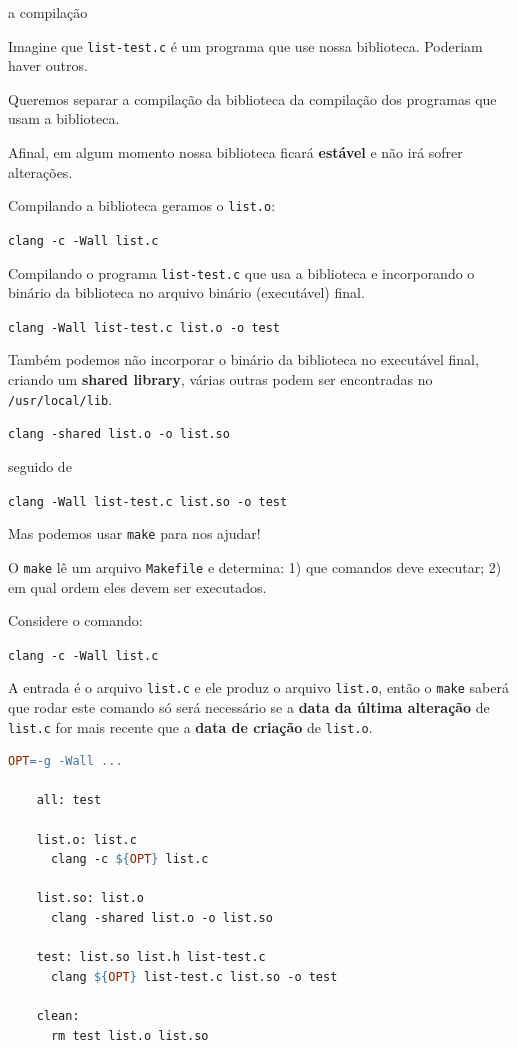 \documentclass{beamer}
\begin{document}
\begin{frame}{a compilação}

  Imagine que \texttt{list-test.c} é um programa que use nossa
  biblioteca. Poderiam haver outros.

  Queremos separar a compilação da biblioteca da compilação dos programas que usam a biblioteca.

  Afinal, em algum momento nossa biblioteca ficará \textbf{estável} e
  não irá sofrer alterações.

  \framebreak

  Compilando a biblioteca geramos o \texttt{list.o}:

  \texttt{clang -c -Wall list.c}

  Compilando o programa \texttt{list-test.c} que usa a biblioteca e
  incorporando o binário da biblioteca no arquivo binário (executável)
  final.
  
  \texttt{clang -Wall list-test.c list.o -o test}

  \framebreak

  Também podemos não incorporar o binário da biblioteca no executável
  final, criando um \textbf{shared library}, várias outras podem ser
  encontradas no \texttt{/usr/local/lib}.

  \texttt{clang -shared list.o -o list.so}

  seguido de

  \texttt{clang -Wall list-test.c list.so -o test}

  \framebreak

  Mas podemos usar \texttt{make} para nos ajudar!

  O \texttt{make} lê um arquivo \texttt{Makefile} e determina: 1) que
  comandos deve executar; 2) em qual ordem eles devem ser executados.

  Considere o comando:

  \texttt{clang -c -Wall list.c}

  A entrada é o arquivo \texttt{list.c} e ele produz o arquivo
  \texttt{list.o}, então o \texttt{make} saberá que rodar este comando
  só será necessário se a \textbf{data da última alteração} de
  \texttt{list.c} for mais recente que a \textbf{data de criação} de
  \texttt{list.o}.

  \framebreak

  \begin{lstlisting}[style=code,language=make,caption=src/Makefile]
    OPT=-g -Wall ...

    all: test

    list.o: list.c
      clang -c ${OPT} list.c

    list.so: list.o
      clang -shared list.o -o list.so

    test: list.so list.h list-test.c
      clang ${OPT} list-test.c list.so -o test

    clean:
      rm test list.o list.so
  \end{lstlisting}
  
\end{frame}
\end{document}
